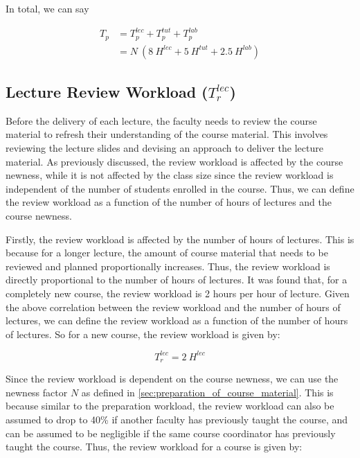 In total, we can say

\begin{equation}
  \label{eqn:preparation-workload-total}
  \begin{aligned}
    T_p & = T_p^{lec} + T_p^{tut} + T_p^{lab}           \\
        & = N\ (8\ H^{lec} + 5\ H^{tut} + 2.5\ H^{lab})
  \end{aligned}
\end{equation}

\subsection{Lecture Review Workload (\texorpdfstring{\(T_r^{lec}\)}{})}

Before the delivery of each lecture, the faculty needs to review the course material to refresh their understanding of the course material. This involves reviewing the lecture slides and devising an approach to deliver the lecture material. As previously discussed, the review workload is affected by the course newness, while it is not affected by the class size since the review workload is independent of the number of students enrolled in the course. Thus, we can define the review workload as a function of the number of hours of lectures and the course newness.

Firstly, the review workload is affected by the number of hours of lectures. This is because for a longer lecture, the amount of course material that needs to be reviewed and planned proportionally increases. Thus, the review workload is directly proportional to the number of hours of lectures. It was found that, for a completely new course, the review workload is 2 hours per hour of lecture. Given the above correlation between the review workload and the number of hours of lectures, we can define the review workload as a function of the number of hours of lectures. So for a new course, the review workload is given by:

\begin{equation*}
  \label{eqn:review-workload}
  T_r^{lec} = 2\ H^{lec}
\end{equation*}

Since the review workload is dependent on the course newness, we can use the newness factor \(N\) as defined in \autoref{sec:preparation_of_course_material}. This is because similar to the preparation workload, the review workload can also be assumed to drop to 40\% if another faculty has previously taught the course, and can be assumed to be negligible if the same course coordinator has previously taught the course. Thus, the review workload for a course is given by:


